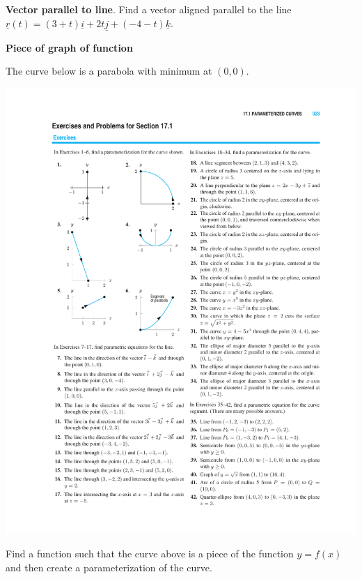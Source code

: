 \documentclass[12pt,letterpaper,noanswers]{exam}
\newcommand{\mb}[1]{\underline{#1}}
\begin{document}

\vspace{1cm}

\noindent\textbf{Vector parallel to line}.
Find a vector aligned parallel to the line $\mb r(t)=(3+t)\mb i + 2t\mb j+ (-4-t)\mb k$.

\vspace{1cm}



\noindent\textbf{Piece of graph of function}

The curve below is a parabola with minimum at $(0,0)$.

\includegraphics{img/N22_c4.pdf} 

Find a function such that the curve above is a piece of the function $y = f(x)$ and then create a parameterization of the curve. 

\vspace{2in}
\end{document}
